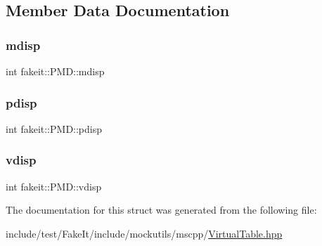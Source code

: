 \subsection{Member Data Documentation}
\mbox{\label{structfakeit_1_1PMD_a350eb920bfbfbf46295bb82dc5592399}} 
\subsubsection{\texorpdfstring{mdisp}{mdisp}}
{\footnotesize\ttfamily int fakeit\+::\+P\+M\+D\+::mdisp}

\mbox{\label{structfakeit_1_1PMD_ac9c12588abe271bf97903aaac006bca3}} 
\subsubsection{\texorpdfstring{pdisp}{pdisp}}
{\footnotesize\ttfamily int fakeit\+::\+P\+M\+D\+::pdisp}

\mbox{\label{structfakeit_1_1PMD_a7262cf758cef2cebfceb2cd374c5e8ce}} 
\subsubsection{\texorpdfstring{vdisp}{vdisp}}
{\footnotesize\ttfamily int fakeit\+::\+P\+M\+D\+::vdisp}



The documentation for this struct was generated from the following file\+:\begin{DoxyCompactItemize}
\item 
include/test/\+Fake\+It/include/mockutils/mscpp/\mbox{\hyperlink{mscpp_2VirtualTable_8hpp}{Virtual\+Table.\+hpp}}\end{DoxyCompactItemize}

